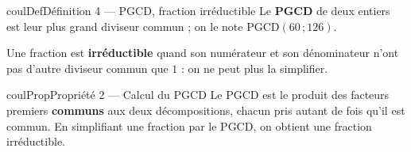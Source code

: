 \documentclass[11pt,a4paper]{article}
\makeatletter
\newcounter{lycee@signet}
\newcommand{\signet}[3][]{\stepcounter{lycee@signet}%
  \edef\lycee@dest{\if\relax\detokenize{#1}\relax
    signet.\arabic{lycee@signet}\else#1\fi}%
  \hypertarget{\lycee@dest}{}\bookmark[level=#2,dest=\lycee@dest]{#3}}
\newenvironment{definitionbox}[1][Définition]%
  {\begin{boitecours}[phantom={\signet{2}{#1}}]{coulDef}{#1}}{\end{boitecours}}
\newenvironment{proprietebox}[1][Propriété]%
  {\begin{boitecours}[phantom={\signet{2}{#1}}]{coulProp}{#1}}{\end{boitecours}}
\makeatother
\begin{document}
\begin{definitionbox}[Définition 4 --- PGCD, fraction irréductible]
Le \textbf{PGCD} de deux entiers est leur plus grand diviseur commun ; on le note
$\mathrm{PGCD}(60\,;126)$.

\smallskip
Une fraction est \textbf{irréductible} quand son numérateur et son dénominateur n'ont pas
d'autre diviseur commun que $1$ : on ne peut plus la simplifier.
\end{definitionbox}

\begin{proprietebox}[Propriété 2 --- Calcul du PGCD]
Le PGCD est le produit des facteurs premiers \textbf{communs} aux deux décompositions,
chacun pris autant de fois qu'il est commun. En simplifiant une fraction par le PGCD, on
obtient une fraction irréductible.
\end{proprietebox}
\end{document}
